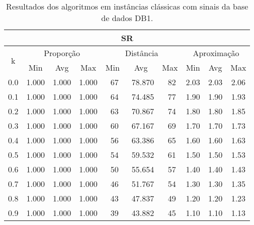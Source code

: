 \begin{table}[!p]
\caption{Resultados dos algoritmos em instâncias clássicas com sinais da base de dados DB1.}
\label{table:CLTLBDUJ}
\begin{center}
\scriptsize
{\def\arraystretch{1.05}\tabcolsep=8pt
\begin{tabular}{|c|c|c|c|c|c|c|c|c|c|}
\hline
\multicolumn{10}{|c|}{\bf SR}                                                                                             \\ \hline
\multirow{2}{*}{k} & \multicolumn{3}{c|}{Proporção}  & \multicolumn{3}{c|}{Distância} & \multicolumn{3}{c|}{Aproximação}  \\ \cline{2-10}
                   & Min       & Avg      & Max      & Min      & Avg      & Max     & Min     & Avg    & Max             \\ \hline
0.0                & 1.000     & 1.000    & 1.000    & ~67      & ~78.870  & ~82     & 2.03    & 2.03   & 2.06            \\ \hline
0.1                & 1.000     & 1.000    & 1.000    & ~64      & ~74.485  & ~77     & 1.90    & 1.90   & 1.93            \\ \hline
0.2                & 1.000     & 1.000    & 1.000    & ~63      & ~70.867  & ~74     & 1.80    & 1.80   & 1.85            \\ \hline
0.3                & 1.000     & 1.000    & 1.000    & ~60      & ~67.167  & ~69     & 1.70    & 1.70   & 1.73            \\ \hline
0.4                & 1.000     & 1.000    & 1.000    & ~56      & ~63.386  & ~65     & 1.60    & 1.60   & 1.63            \\ \hline
0.5                & 1.000     & 1.000    & 1.000    & ~54      & ~59.532  & ~61     & 1.50    & 1.50   & 1.53            \\ \hline
0.6                & 1.000     & 1.000    & 1.000    & ~50      & ~55.654  & ~57     & 1.40    & 1.40   & 1.43            \\ \hline
0.7                & 1.000     & 1.000    & 1.000    & ~46      & ~51.767  & ~54     & 1.30    & 1.30   & 1.35            \\ \hline
0.8                & 1.000     & 1.000    & 1.000    & ~43      & ~47.837  & ~49     & 1.20    & 1.20   & 1.23            \\ \hline
0.9                & 1.000     & 1.000    & 1.000    & ~39      & ~43.882  & ~45     & 1.10    & 1.10   & 1.13            \\ \hline

\end{tabular}}
\end{center}
\end{table}
